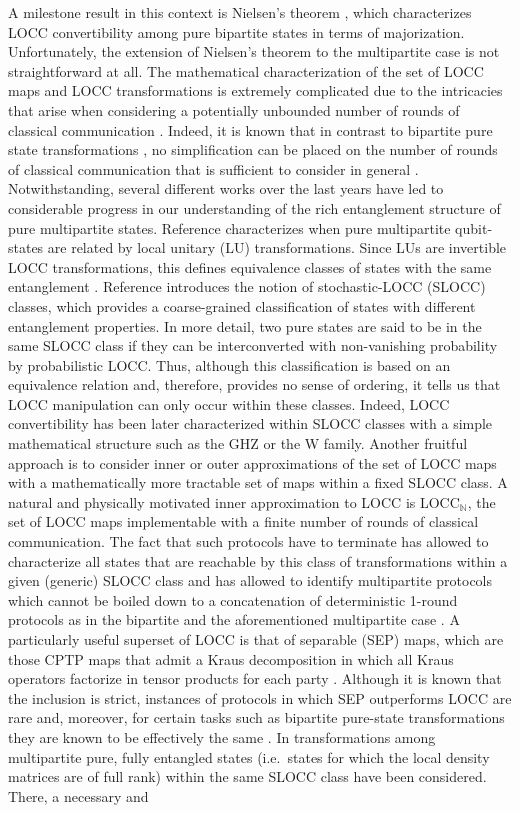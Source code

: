 \documentclass[superscriptaddress,twocolumn]{revtex4}\usepackage[utf8]{inputenc}
\begin{document}
A milestone result in this context is Nielsen's theorem \cite{nielsen}, which characterizes LOCC convertibility among pure bipartite states in terms of majorization. Unfortunately, the extension of Nielsen's theorem to the multipartite case is not straightforward at all. The mathematical characterization of the set of LOCC maps and LOCC transformations is extremely complicated due to the intricacies that arise when considering a potentially unbounded number of rounds of classical communication \cite{ChLe14}. Indeed, it is known that in contrast to bipartite pure state transformations \cite{LoPopescu}, no simplification can be placed on the number of rounds of classical communication that is sufficient to consider in general \cite{Ch11,ChHs17}.
Notwithstanding, several different works over the last years have led to considerable progress in our understanding of the rich entanglement structure of pure multipartite states. Reference \cite{Kr10} characterizes when pure multipartite qubit-states are related by local unitary (LU) transformations. Since LUs are invertible LOCC transformations, this defines equivalence classes of states with the same entanglement \cite{Gi02}. Reference \cite{slocc} introduces the notion of stochastic-LOCC (SLOCC) classes, which provides a coarse-grained classification of states with different entanglement properties. In more detail, two pure states are said to be in the same SLOCC class if they can be interconverted with non-vanishing probability by probabilistic LOCC. Thus, although this classification is based on an equivalence relation and, therefore, provides no sense of ordering, it tells us that LOCC manipulation can only occur within these classes. Indeed, LOCC convertibility has been later characterized within SLOCC classes with a simple mathematical structure such as the GHZ \cite{turgutghz} or the W \cite{turgutw} family. Another fruitful approach is to consider inner or outer approximations of the set of LOCC maps with a mathematically more tractable set of maps within a fixed SLOCC class. A natural and physically motivated inner approximation to LOCC is LOCC$_\mathbb{N}$, the set of LOCC maps implementable with a finite number of rounds of classical communication. The fact that such protocols have to terminate has allowed to characterize all states that are reachable by this class of transformations within a given (generic) SLOCC class and has allowed to identify multipartite protocols which cannot be boiled down to a concatenation of deterministic 1-round protocols as in the bipartite and the aforementioned multipartite case \cite{Spde17}. A particularly useful superset of LOCC is that of separable (SEP) maps, which are those CPTP maps that admit a Kraus decomposition in which all Kraus operators factorize in tensor products for each party \cite{rains}. Although it is known that the inclusion is strict, instances of protocols in which SEP outperforms LOCC are rare \cite{sepnotlocc} and, moreover, for certain tasks such as bipartite pure-state transformations they are known to be effectively the same \cite{gheorghiu}. In \cite{GoWa11} transformations among multipartite pure, fully entangled states (i.e.\ states for which the local density matrices are of full rank) within the same SLOCC class have been considered. There, a necessary and 
\end{document}
